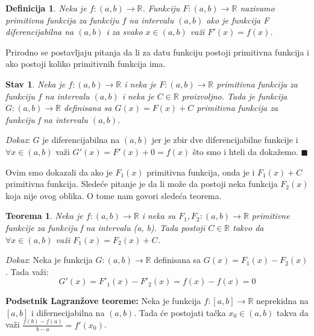 \documentclass{article}
\newtheorem{definicija}{Definicija}[section]
\newtheorem{teorema}{Teorema}[section]
\newtheorem{stav}{Stav}[section]
\begin{document}
\begin{definicijabox}
    \begin{definicija}
        Neka je $f:(a, b) \longrightarrow \mathbb{R}$.
        Funkciju $F:(a, b) \longrightarrow \mathbb{R}$ nazivamo primitivna
        funkcija za funkciju $f$ na intervalu $(a, b)$ ako je funkcija F
        diferencijabilna na $(a, b)$ i za svako $x \in (a,b)$ važi
        $F'(x) = f(x)$.
    \end{definicija}
\end{definicijabox}
Prirodno se postavljaju pitanja da li za datu funkciju postoji
primitivna funkcija i ako postoji koliko primitivnih funkcija ima.
\begin{stavbox}
    \begin{stav}
        Neka je $f: (a, b) \longrightarrow \mathbb{R}$
        i neka je $F: (a,b) \longrightarrow \mathbb{R}$
        primitivna funkcija za funkciju $f$ na intervalu $(a, b)$
        i neka je $C \in \mathbb{R}$ proizvoljno. Tada je
        funkcija $G: (a, b) \longrightarrow \mathbb{R}$
        definisana sa $G(x) = F(x) + C$ primitivna funkcija za
        funkciju f na intervalu $(a, b)$.
    \end{stav}
\end{stavbox}
\textit{Dokaz}: $G$ je diferencijabilna na $(a, b)$ jer je zbir dve
diferencijabilne funkcije i $\forall x \in (a, b)$ važi $G'(x) = F'(x) + 0 = f(x)$
što smo i hteli da dokažemo.
\null\hfill $\blacksquare$ \par
Ovim smo dokazali da ako je $F_1(x)$ primitivna funkcija, onda
je i $F_1(x)+C$ primitivna funkcija. Sledeće pitanje je da li
može da postoji neka funkcija $F_2(x)$ koja nije ovog oblika.
O tome nam govori sledeća teorema.
\begin{teoremabox}
    \begin{teorema}
        Neka je $f: (a, b) \longrightarrow \mathbb{R}$ i
        neka su $F_1, F_2: (a,b) \longrightarrow \mathbb{R}$
        primitivne funkcije za funkciju f na intervalu (a, b).
        Tada postoji $C \in \mathbb{R}$ takvo da
        $\forall x \in (a, b)$ važi $F_1(x) = F_2(x) + C$.
    \end{teorema}
\end{teoremabox}

\textit{Dokaz}: Neka je funkcija $G: (a, b) \longrightarrow \mathbb{R}$
definisana sa $G(x) = F_1(x) - F_2(x)$. Tada važi:
\begin{equation*}
    G'(x) = F'_1(x) - F'_2(x) = f(x) - f(x) = 0
\end{equation*}
\begin{teoremabox}
    \textbf{Podsetnik Lagranžove teoreme:} Neka je funkcija
    $f : [a,b]\rightarrow\mathbb{R}$ neprekidna na $[a,b]$
    i difernecijabilna na $(a,b)$. Tada će
    postojati tačka $x_0\in(a,b)$ takva da važi
    $\frac{f(b)-f(a)}{b-a}=f'(x_0)$.
\end{teoremabox}
\end{document}
